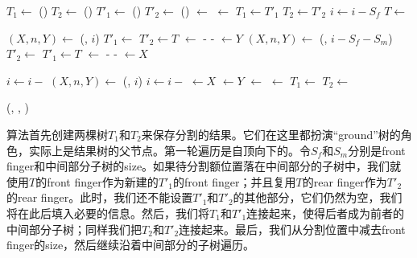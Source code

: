 \documentclass[UTF8]{article}
\begin{document}
\begin{algorithmic}
  \State $T_1 \gets$ ()
  \State $T_2 \gets$ ()
   
    \State $T'_1 \gets$ ()
    \State $T'_2 \gets$ ()
    \State {} $\gets$ 
    \State {} $\gets$ 
    \State {}
    \State {}
    \State $T_1 \gets T'_1$
    \State $T_2 \gets T'_2$
    \State $i \gets i - S_f$
    \State $T \gets$ 
  \EndWhile

    \State $(X, n, Y) \gets$ (, $i$)
    \State $T'_1 \gets$ 
    \State $T'_2 \gets T$
    \State {} $\gets$  -  - 
    \State {} $\gets Y$
    \State $(X, n, Y) \gets$ (, $i - S_f - S_m$)
    \State $T'_2 \gets$ 
    \State $T'_1 \gets T$
    \State {} $\gets$  -  - 
    \State {} $\gets X$
  \EndIf
  \State {}
  \State {}

  \State $i \gets i -$ 
   
    \State $(X, n, Y) \gets$ (, $i$)
    \State $i \gets i -$ 
    \State {} $\gets X$
    \State {} $\gets Y$
    \State {} $\gets$ 
    \State {} $\gets$ 
    \State $T_1 \gets$ 
    \State $T_2 \gets$ 
  \EndWhile

  \State \Return (, , )
\EndFunction
\end{algorithmic}

算法首先创建两棵树$T_1$和$T_2$来保存分割的结果。它们在这里都扮演“ground”树的角色，实际上是结果树的父节点。第一轮遍历是自顶向下的。令$S_f$和$S_m$分别是front finger和中间部分子树的size。如果待分割额位置落在中间部分的子树中，我们就使用$T$的front finger作为新建的$T'_1$的front finger；并且复用$T$的rear finger作为$T'_2$的rear finger。此时，我们还不能设置$T'_1$和$T'_2$的其他部分，它们仍然为空，我们将在此后填入必要的信息。然后，我们将$T_1$和$T'_1$连接起来，使得后者成为前者的中间部分子树；同样我们把$T_2$和$T'_2$连接起来。最后，我们从分割位置中减去front finger的size，然后继续沿着中间部分的子树遍历。
\end{document}
